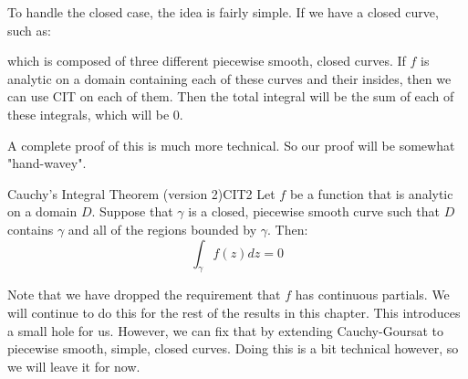 To handle the closed case, the idea is fairly simple. If we have a closed curve, such as:

\begin{center}
\end{center}

\noin which is composed of three different piecewise smooth, closed curves. If $f$ is analytic on a domain containing each of these curves and their insides, then we can use CIT on each of them. Then the total integral will be the sum of each of these integrals, which will be $0$.

A complete proof of this is much more technical. So our proof will be somewhat "hand-wavey".

\begin{thmbo}{Cauchy's Integral Theorem (version 2)}{CIT2} Let $f$ be a function that is analytic on a domain $D$. Suppose that $\gamma$ is a closed, piecewise smooth curve such that $D$ contains $\gamma$ and all of the regions bounded by $\gamma$. Then:
$$\int_{\gamma}f(z)dz = 0$$
\end{thmbo}

Note that we have dropped the requirement that $f$ has continuous partials. We will continue to do this for the rest of the results in this chapter. This introduces a small hole for us. However, we can fix that by extending Cauchy-Goursat to piecewise smooth, simple, closed curves. Doing this is a bit technical however, so we will leave it for now.

